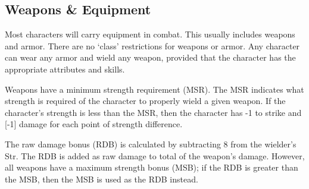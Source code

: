 \documentclass[twoside]{book}
\begin{document}
    

\subsection{Weapons \& Equipment}
    
    {  
     Most characters will carry equipment in combat. This
               usually includes weapons and armor. There are no
               `class' restrictions for weapons or armor. Any
               character can wear any armor and wield any weapon,
               provided that the character has the appropriate attributes
               and skills. 
    }
  
    {  
     Weapons have a minimum strength requirement (MSR).
               The MSR indicates what strength is required of the
               character to properly wield a given weapon. If the
               character's strength is less than the MSR, then the
               character has -1 to strike and [-1] damage for each point
               of strength difference. 
    }
  
    {  
     The raw damage bonus (RDB) is calculated by
               subtracting 8 from the wielder's Str. The RDB is
               added as raw damage to total of the weapon's damage.
               However, all weapons have a maximum strength bonus (MSB);
               if the RDB is greater than the MSB, then the MSB is used
               as the RDB instead. 
    }
  
  

  

  
  

  
\end{document}
